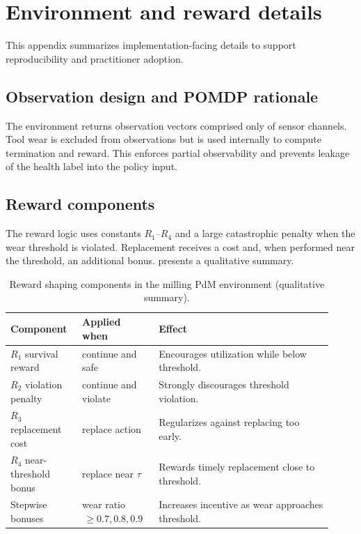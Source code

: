 \documentclass[11pt]{article}
\begin{document}
\appendix
\section{Environment and reward details}
\label{app:env_reward}
This appendix summarizes implementation-facing details to support reproducibility and practitioner adoption.

\subsection{Observation design and POMDP rationale}
The environment returns observation vectors comprised only of sensor channels. Tool wear is excluded from observations but is used internally to compute termination and reward. This enforces partial observability and prevents leakage of the health label into the policy input.

\subsection{Reward components}
The reward logic uses constants $R_1$--$R_4$ and a large catastrophic penalty when the wear threshold is violated. Replacement receives a cost and, when performed near the threshold, an additional bonus.  presents a qualitative summary.

\begin{table}[t]
	\centering
	\caption{Reward shaping components in the milling PdM environment (qualitative summary).}
	\label{tab:reward_components}
	\begin{tabular}{p{0.20\linewidth} p{0.22\linewidth} p{0.50\linewidth}}
		\toprule
		\rowcolor{gray!20} \textbf{Component} & \textbf{Applied when} & \textbf{Effect}\\
		\midrule
		$R_1$ survival reward & continue and safe & Encourages utilization while below threshold.\\
		$R_2$ violation penalty & continue and violate & Strongly discourages threshold violation.\\
		$R_3$ replacement cost & replace action & Regularizes against replacing too early.\\
		$R_4$ near-threshold bonus & replace near $\tau$ & Rewards timely replacement close to threshold.\\
		Stepwise bonuses & wear ratio $\,\ge 0.7, 0.8, 0.9$ & Increases incentive as wear approaches threshold.\\
		\bottomrule
	\end{tabular}
\end{table}
\end{document}
